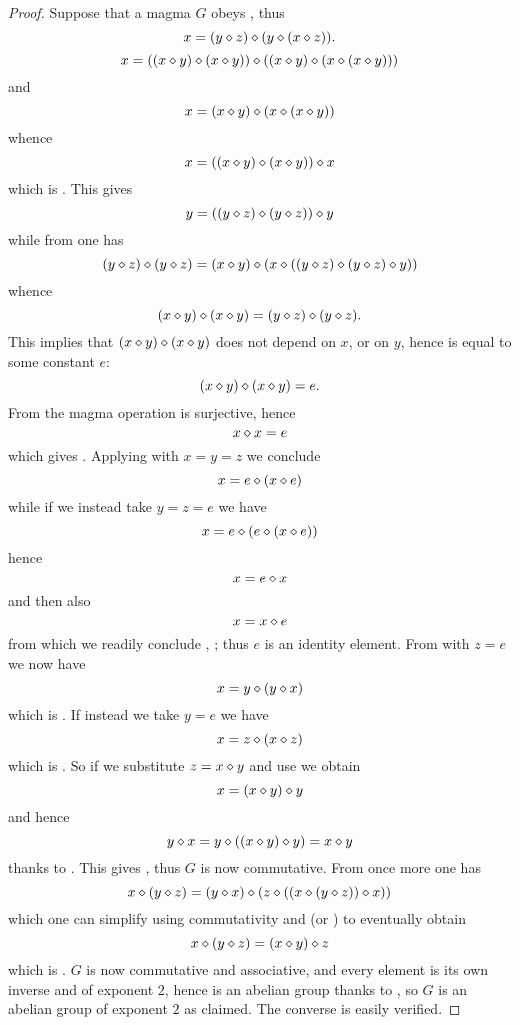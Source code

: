 \begin{proof}\leanok  Suppose that a magma $G$ obeys , thus
\begin{equation}\label{1571-again}
 x = (y \diamond z) \diamond (y \diamond (x \diamond z)).
\end{equation}
$$ x = ((x \diamond y) \diamond (x \diamond y)) \diamond ((x \diamond y) \diamond (x \diamond (x \diamond y)))$$
and
$$ x = (x \diamond y) \diamond (x \diamond (x \diamond y))$$
whence
$$x = ((x \diamond y) \diamond (x \diamond y)) \diamond x$$
which is .  This gives
$$y = ((y \diamond z) \diamond (y \diamond z)) \diamond y$$
while from  one has
$$ (y \diamond z) \diamond (y \diamond z) = (x \diamond y) \diamond (x \diamond ((y \diamond z) \diamond (y \diamond z) \diamond y))$$
whence
$$ (x \diamond y) \diamond (x \diamond y) = (y \diamond z) \diamond (y \diamond z).$$
This implies that $(x \diamond y) \diamond (x \diamond y)$ does not depend on $x$, or on $y$, hence is equal to some constant $e$:
$$ (x \diamond y) \diamond (x \diamond y) = e.$$
From  the magma operation is surjective, hence
\begin{equation}\label{xxe} x \diamond x = e
\end{equation}
which gives .  Applying  with $x=y=z$ we conclude
$$ x = e \diamond (x \diamond e)$$
while if we instead take $y=z=e$ we have
$$ x = e \diamond (e \diamond (x \diamond e))$$
hence
$$ x = e \diamond x$$
and then also
$$ x = x \diamond e$$
from which we readily conclude , ; thus $e$ is an identity element.  From  with $z=e$ we now have
\begin{equation}\label{16-again}
 x = y \diamond (y \diamond x)
\end{equation}
which is . If instead we take $y=e$ we have
\begin{equation}\label{14-again}
  x = z \diamond (x \diamond z)
\end{equation}
which is .  So if we substitute $z = x \diamond y$ and use  we obtain
$$ x = (x \diamond y) \diamond y$$
and hence
$$ y \diamond x = y \diamond ((x \diamond y) \diamond y) = x \diamond y$$
thanks to .  This gives , thus $G$ is now commutative.  From  once more one has
$$x \diamond (y \diamond z) = (y \diamond x) \diamond (z \diamond ((x \diamond (y \diamond z)) \diamond x))$$
which one can simplify using commutativity and  (or ) to eventually obtain
$$x \diamond (y \diamond z) = (x \diamond y) \diamond z$$
which is .  $G$ is now commutative and associative, and every element is its own inverse and of exponent $2$, hence is an abelian group thanks to , so $G$ is an abelian group of exponent $2$ as claimed.  The converse is easily verified.
\end{proof}

